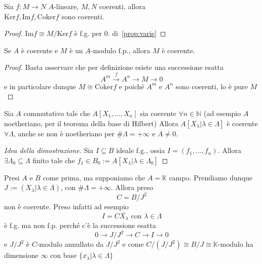 \begin{corollary}{}
    Sia \(f: M \to N\) \(A\)-lineare, \(M, N\) coerenti, allora \\ \(\mathrm{Ker}f, \mathrm{Im}f, \mathrm{Coker}f\) sono coerenti.
\end{corollary}
\begin{proof}{}
    \(\mathrm{Im}f \cong M / \mathrm{Ker} f\) è f.g. per 0. di~\ref{prop:varie}
\end{proof}
\begin{corollary}{}
    Se \(A\) è coerente e \(M\) è un \(A\)-modulo f.p., allora \(M\) è coerente.
\end{corollary}
\begin{proof}{}
    Basta osservare che per definizione esiste una successione esatta 
    \[
      A^{m} \overset{f}{\to } A^{n} \to M \to 0
    \]
    e in particolare dunque \(M \cong \mathrm{Coker}f\) e poiché \(A^{m}\) e \(A^{n}\) sono coerenti, lo è pure \(M\) 
\end{proof}
\begin{example}{}
    Sia \(A\) commutativo tale che \(A[X_{1}, \dots, X_{n}]\) sia coerente \(\forall n \in \mathbb{N}\) (ad esempio \(A\) noetheriano, per il teorema della base di Hilbert)
    Allora \(A[X_{\lambda} | \lambda \in \Lambda]\) è coerente \(\forall \Lambda\), anche se non è noetheriano per \(\# \Lambda = +\infty\) e \(A \neq 0\).
    \begin{proof}[Idea della dimostrazione]
        Sia \(I \subseteq B \) ideale f.g., ossia \(I = {(f_{1}, \dots, f_{n})}\). Allora \(\exists \Lambda_{0} \subseteq \Lambda \) finito tale che \(f_{1} \in B_{0} := A[X_\lambda | \lambda \in \Lambda_{0}]\) 
    \end{proof}
\end{example}
\begin{example}
    Presi \(A\) e \(B\) come prima, ma supponiamo che \(A = \mathbb{K}\) campo.
    Prendiamo dunque \(J := {(X_{\lambda} | \lambda \in \Lambda)}\), con \(\#
    \Lambda = +\infty\). Allora preso
    \[
      C = B / J^2
    \]
    non è coerente. Preso infatti ad esempio 
    \[
      I = C \overline{X_{\lambda} } \text{  con }\lambda \in \Lambda
    \]
    è f.g. ma non f.p. perché c'è la successione esatta 
    \[
      0 \to J / J^2 \to C \to I \to 0
    \]
    e \(J / J^2\) è \(C\)-modulo annullato da \(J / J^2\) e come \(C / {(J / J^2)} \cong B / J \cong \mathbb{K}\)-modulo ha dimensione \(\infty\)  con base \(\{\overline{x_{\lambda} }| \lambda \in \Lambda \} \) 
\end{example}
